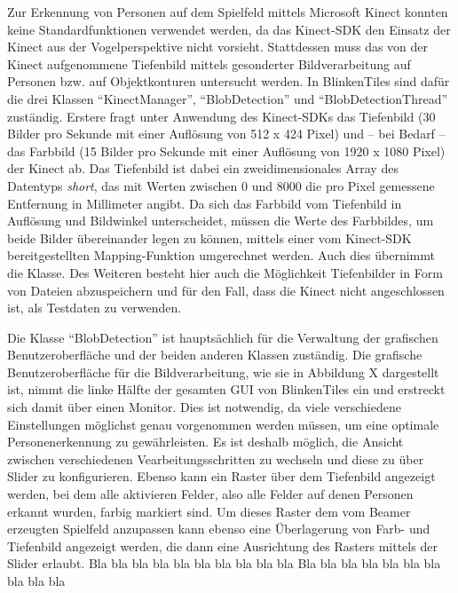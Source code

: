 
Zur Erkennung von Personen auf dem Spielfeld mittels Microsoft Kinect konnten keine Standardfunktionen verwendet werden, da das Kinect-SDK den Einsatz der Kinect aus der Vogelperspektive nicht vorsieht. Stattdessen muss das von der Kinect aufgenommene Tiefenbild mittels gesonderter Bildverarbeitung auf Personen bzw. auf Objektkonturen untersucht werden. In BlinkenTiles sind dafür die drei Klassen \enquote{KinectManager}, \enquote{BlobDetection} und \enquote{BlobDetectionThread} zuständig. Erstere fragt unter Anwendung des Kinect-SDKs das Tiefenbild (30 Bilder pro Sekunde mit einer Auflösung von 512 x 424 Pixel) und -- bei Bedarf -- das Farbbild (15 Bilder pro Sekunde mit einer Auflösung von 1920 x 1080 Pixel) der Kinect ab. Das Tiefenbild ist dabei ein zweidimensionales Array des Datentyps \emph{short}, das mit Werten zwischen 0 und 8000 die pro Pixel gemessene Entfernung in Millimeter angibt. Da sich das Farbbild vom Tiefenbild in Auflösung und Bildwinkel unterscheidet, müssen die Werte des Farbbildes, um beide Bilder übereinander legen zu können, mittels einer vom Kinect-SDK bereitgestellten Mapping-Funktion umgerechnet werden. Auch dies übernimmt die Klasse. Des Weiteren besteht hier auch die Möglichkeit Tiefenbilder in Form von Dateien abzuspeichern und für den Fall, dass die Kinect nicht angeschlossen ist, als Testdaten zu verwenden.

Die Klasse \enquote{BlobDetection} ist hauptsächlich für die Verwaltung der grafischen Benutzeroberfläche und der beiden anderen Klassen zuständig. Die grafische Benutzeroberfläche für die Bildverarbeitung, wie sie in Abbildung X dargestellt ist, nimmt die linke Hälfte der gesamten GUI von BlinkenTiles ein und erstreckt sich damit über einen Monitor. Dies ist notwendig, da viele verschiedene Einstellungen möglichst genau vorgenommen werden müssen, um eine optimale Personenerkennung zu gewährleisten. Es ist deshalb möglich, die Ansicht zwischen verschiedenen Vearbeitungsschritten zu wechseln und diese zu über Slider zu konfigurieren. Ebenso kann ein Raster über dem Tiefenbild angezeigt werden, bei dem alle aktivieren Felder, also alle Felder auf denen Personen erkannt wurden, farbig markiert sind. Um dieses Raster dem vom Beamer erzeugten Spielfeld anzupassen kann ebenso eine Überlagerung von Farb- und Tiefenbild angezeigt werden, die dann eine Ausrichtung des Rasters mittels der Slider erlaubt. Bla bla bla bla bla bla bla bla bla bla Bla bla bla bla bla bla bla bla bla bla

